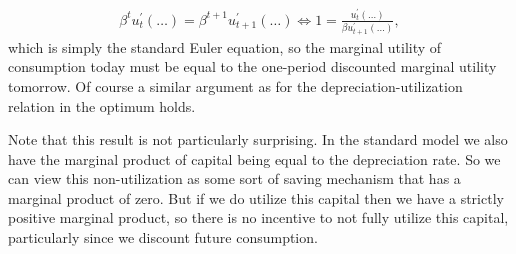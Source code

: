 \documentclass[a4paper]{article}
\theoremstyle{definition}
\begin{document}
	\begin{align}
	\beta^t u^\prime_t(\dots) = \beta^{t+1} u_{t+1}^\prime(\dots) \Leftrightarrow 1 = \frac{u^\prime_t(\dots)}{\beta u^\prime_{t+1}(\dots)},
	\end{align}	
which is simply the standard Euler equation, so the marginal utility of consumption today must be equal to the one-period discounted marginal utility tomorrow. Of course a similar argument as for the depreciation-utilization relation in the optimum holds.

Note that this result is not particularly surprising. In the standard model we also have the marginal product of capital being equal to the depreciation rate. So we can view this non-utilization as some sort of saving mechanism that has a marginal product of zero. But if we do utilize this capital then we have a strictly positive marginal product, so there is no incentive to not fully utilize this capital, particularly since we discount future consumption.
\end{document}
